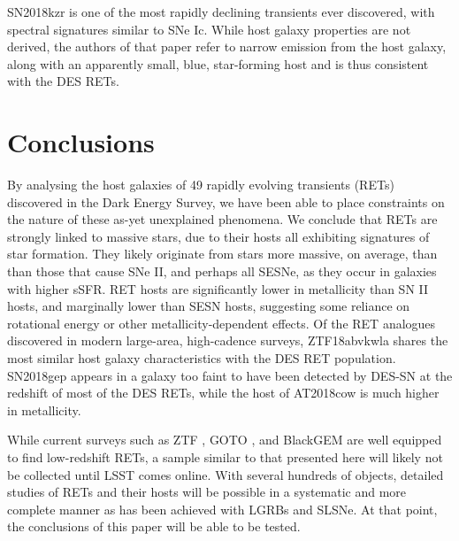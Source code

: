\documentclass[fleqn,usenatbib,]{mnras}
\begin{document}
SN2018kzr \citep{McBrien2019} is one of the most rapidly declining transients ever discovered, with spectral signatures similar to SNe Ic. While host galaxy properties are not derived, the authors of that paper refer to narrow emission from the host galaxy, along with an apparently small, blue, star-forming host and is thus consistent with the DES RETs.


\section{Conclusions}
\label{sec:conc}
By analysing the host galaxies of 49 rapidly evolving transients (RETs) discovered in the Dark Energy Survey, we have been able to place constraints on the nature of these as-yet unexplained phenomena. We conclude that RETs are strongly linked to massive stars, due to their hosts all exhibiting signatures of star formation. They likely originate from stars more massive, on average, than than those that cause SNe II, and perhaps all SESNe, as they occur in galaxies with higher sSFR. RET hosts are significantly lower in metallicity than SN II hosts, and marginally lower than SESN hosts, suggesting some reliance on rotational energy or other metallicity-dependent effects.
Of the RET analogues discovered in modern large-area, high-cadence surveys, ZTF18abvkwla shares the most similar host galaxy characteristics with the DES RET population. SN2018gep appears in a galaxy too faint to have been detected by DES-SN at the redshift of most of the DES RETs, while the host of AT2018cow is much higher in metallicity.

While current surveys such as ZTF \citep{Bellm2019}, GOTO \citep{Dyer2018}, and BlackGEM \citep{Bloemen2016} are well equipped to find low-redshift RETs, a sample similar to that presented here will likely not be collected until LSST comes online. With several hundreds of objects, detailed studies of RETs and their hosts will be possible in a systematic and more complete manner as has been achieved with LGRBs and SLSNe. At that point, the conclusions of this paper will be able to be tested.
\end{document}
